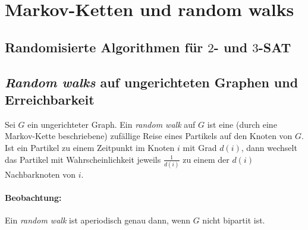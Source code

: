 \section{Markov-Ketten und random walks}
\subsection{Randomisierte Algorithmen für $2$- und $3$-SAT}
\subsection{\emph{Random walks} auf ungerichteten Graphen und Erreichbarkeit}
\begin{defn}
	Sei $G$ ein ungerichteter Graph. Ein \emph{random walk} auf $G$ ist
	eine (durch eine Markov-Kette beschriebene) zufällige Reise eines
	Partikels auf den Knoten von $G$. Ist ein Partikel zu einem Zeitpunkt
	im Knoten $i$ mit Grad $d(i)$, dann wechselt das Partikel mit
	Wahrscheinlichkeit jeweils $\frac{1}{d(i)}$ zu einem der $d(i)$
	Nachbarknoten von $i$.
\end{defn}
\paragraph{Beobachtung:} Ein \emph{random walk} ist aperiodisch genau dann,
wenn $G$ nicht bipartit ist.

